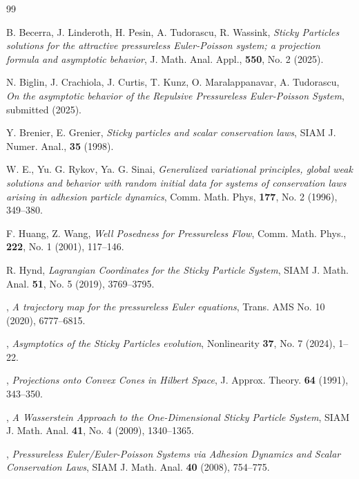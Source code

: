 \documentclass[11pt]{article}
\numberwithin{equation}{section}
\begin{document}

\begin{thebibliography}{99}

 {\sc B. Becerra, J. Linderoth, H. Pesin, A. Tudorascu, R. Wassink}, {\em Sticky Particles solutions for the attractive pressureless Euler-Poisson system; a projection formula and asymptotic behavior}, J. Math. Anal. Appl., \textbf{550}, No. 2 (2025).

 {\sc N. Biglin, J. Crachiola, J. Curtis, T. Kunz, O. Maralappanavar, A. Tudorascu}, {\em On the asymptotic behavior of the Repulsive Pressureless Euler-Poisson System}, submitted (2025). 

{\sc Y. Brenier, E. Grenier},
{\em Sticky particles and scalar conservation laws}, SIAM J. Numer. Anal., \textbf{35} (1998). 

{\sc W. E., Yu. G. Rykov, Ya. G. Sinai}, {\em Generalized variational principles, global weak solutions and behavior with random initial data for systems of conservation laws arising in adhesion particle dynamics}, 
Comm. Math. Phys, \textbf{177}, No. 2 (1996), 349--380.

 {\sc F. Huang, Z. Wang},
{\em Well Posedness for Pressureless Flow},
Comm. Math. Phys., \textbf{222}, No. 1 (2001), 117--146.

 {\sc R. Hynd},
\emph{Lagrangian Coordinates for the Sticky Particle System}, SIAM J. Math. Anal. \textbf{51}, No. 5 (2019), 3769--3795.

, \emph{A trajectory map for the pressureless Euler equations}, Trans. AMS No. 10 (2020), 6777--6815. 

, \emph{Asymptotics of the Sticky Particles evolution}, 
Nonlinearity \textbf{37}, No. 7 (2024), 1--22.

, \emph{Projections onto Convex Cones in Hilbert Space}, J. Approx. Theory. \textbf{64} (1991), 343--350. 

, \emph{A Wasserstein Approach to the One-Dimensional Sticky Particle System}, SIAM J. Math. Anal.
   \textbf{41}, No. 4 (2009), 1340--1365.
   
, \emph{Pressureless Euler/Euler-Poisson Systems via Adhesion Dynamics and Scalar Conservation Laws}, SIAM J. Math. Anal. \textbf{40} (2008), 754--775.


\end{thebibliography}
\end{document}
